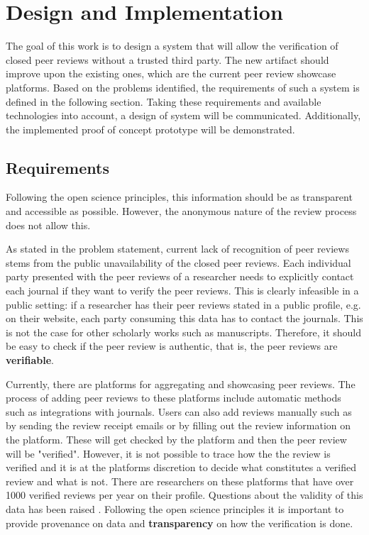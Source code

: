 
\chapter{Design and Implementation}\label{chapter:design}

The goal of this work is to design a system that will allow the verification of closed peer reviews without a trusted third party. The new artifact should improve upon the existing ones, which are the current peer review showcase platforms. Based on the problems identified, the requirements of such a system is defined in the following section. Taking these requirements and available technologies into account, a design of system will be communicated. Additionally, the implemented proof of concept prototype will be demonstrated.

\section{Requirements} \label{sec:requirements}

Following the open science principles, this information should be as transparent and accessible as possible. However, the anonymous nature of the review process does not allow this. 

As stated in the problem statement, current lack of recognition of peer reviews stems from the public unavailability of the closed peer reviews. Each individual party presented with the peer reviews of a researcher needs to explicitly contact each journal if they want to verify the peer reviews. This is clearly infeasible in a public setting: if a researcher has their peer reviews stated in a public profile, e.g. on their website, each party consuming this data has to contact the journals. This is not the case for other scholarly works such as manuscripts. Therefore, it should be easy to check if the peer review is authentic, that is, the peer reviews are \textbf{verifiable}.

Currently, there are platforms for aggregating and showcasing peer reviews. The process of adding peer reviews to these platforms include automatic methods such as integrations with journals. Users can also add reviews manually such as by sending the review receipt emails or by filling out the review information on the platform. These will get checked by the platform and then the peer review will be "verified". However, it is not possible to trace how the the review is verified and it is at the platforms discretion to decide what constitutes a verified review and what is not. There are researchers on these platforms that have over 1000 verified reviews per year on their profile. Questions about the validity of this data has been raised \parencite{TeixeiradaSilva.2020, TeixeiradaSilva.2017, TeixeiradaSilva.2019}. Following the open science principles it is important to provide provenance on data and \textbf{transparency} on how the verification is done.

